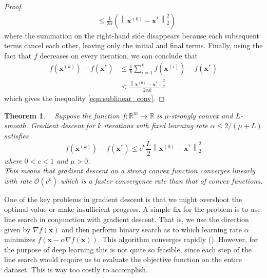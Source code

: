 \documentclass[12pt]{report}
\newtheorem{thm}{Theorem}[section]
\numberwithin{equation}{section}
\begin{document}
\begin{proof}
\begin{equation}
\begin{split}
& \leq \frac{1}{2 \alpha}\left(\left\|\bm{x}^{(0)}-\bm{x}^{*}\right\|_{2}^{2}\right)
\end{split}
\end{equation}
where the summation on the right-hand side disappears because each subsequent terms cancel each other, leaving only the initial and final terms. Finally, using the fact that $f$ decreases on every iteration, we can conclude that
\begin{equation}
\begin{split}
f\left(\bm{x}^{(k)}\right)-f\left(\bm{x}^{*}\right) & \leq \frac{1}{k} \sum_{i=1}^{k} f\left(\bm{x}^{(i)}\right)-f\left(\bm{x}^{*}\right) \\
& \leq \frac{\left\|\bm{x}^{(0)}-\bm{x}^{*}\right\|_{2}^{2}}{2 \alpha k}
\end{split}
\end{equation}
which gives the inequality \eqref{eqn:sublinear_conv}.
\end{proof}
\begin{thm}
\normalfont \textbf{~\cite{bottou2018optimization}}
Suppose the function $f: \mathbb{R}^{m} \rightarrow \mathbb{R}$ is $\mu$-strongly convex and $L$-smooth. Gradient descent for $k$ iterations with  fixed learning rate $\alpha \leq 2 / (\mu + L)$ satisfies
\begin{equation}\label{eqn:linear_conv}
f\left(\bm{x}^{(k)}\right)-f\left(\bm{x}^{*}\right) \leq c^k \frac{L}{2} \left\|\bm{x}^{(0)}-\bm{x}^{*}\right\|_{2}^{2}
\end{equation}
where $0<c<1$ and $\mu > 0$. \\ 
This means that gradient descent on a strong convex function converges linearly with rate $\mathcal{O}(c^k)$ which is a faster convergence rate than that of convex functions. %
\end{thm}
\noindent One of the key problems in gradient descent is that we might overshoot the optimal value or make insufficient progress. A simple fix for the problem is to use line search in conjunction with gradient descent. That is, we use the direction given by $\nabla f(\bm{x})$ and then perform binary search as to which learning rate $\alpha$ minimizes $f(\bm{x} - \alpha\nabla f(\bm{x}))$.
This algorithm converges rapidly (\textbf{\cite{boyd2004convex}}). However, for the purpose of deep learning this is not quite so feasible, since each step of the line search would require us to evaluate the objective function on the entire dataset. This is way too costly to accomplish.
\end{document}
